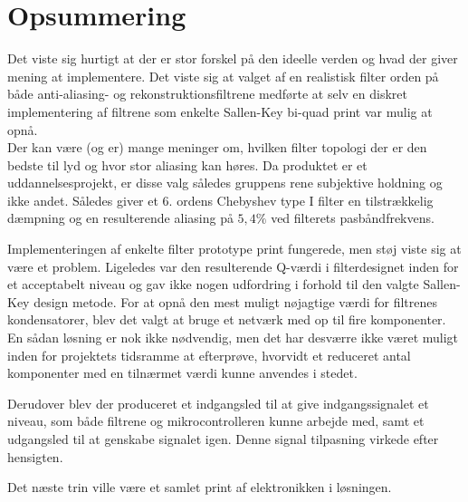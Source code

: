 \section{Opsummering}

Det viste sig hurtigt at der er stor forskel på den ideelle verden og hvad der giver mening at implementere.
Det viste sig at valget af en realistisk filter orden på både anti-aliasing- og rekonstruktionsfiltrene medførte at selv en diskret implementering af filtrene som enkelte Sallen-Key bi-quad print var mulig at opnå.
\\
Der kan være (og er) mange meninger om, hvilken filter topologi der er den bedste til lyd og hvor stor aliasing kan høres.
Da produktet er et uddannelsesprojekt, er disse valg således gruppens rene subjektive holdning og ikke andet.
Således giver et 6. ordens Chebyshev type I filter en tilstrækkelig dæmpning og en resulterende aliasing på  $5,4\si\percent$ ved filterets pasbåndfrekvens. 

Implementeringen af enkelte filter prototype print fungerede, men støj viste sig at være et problem.
Ligeledes var den resulterende Q-værdi i filterdesignet inden for et acceptabelt niveau og gav ikke nogen udfordring i forhold til den valgte Sallen-Key design metode. 
For at opnå den mest muligt nøjagtige værdi for filtrenes kondensatorer, blev det valgt at bruge et netværk med op til fire komponenter.
En sådan løsning er nok ikke nødvendig, men det har desværre ikke været muligt inden for projektets tidsramme at efterprøve, hvorvidt et reduceret antal komponenter med en tilnærmet værdi kunne anvendes i stedet. %

Derudover blev der produceret et indgangsled til at give indgangssignalet et niveau, som både filtrene og mikrocontrolleren kunne arbejde med, samt et udgangsled til at genskabe signalet igen.
Denne signal tilpasning virkede efter hensigten.

Det næste trin ville være et samlet print af elektronikken i løsningen.